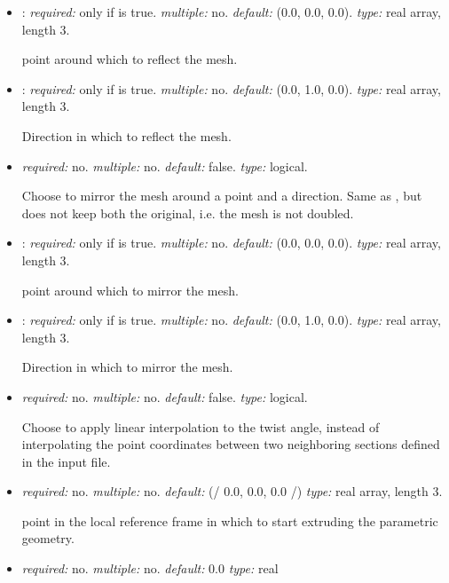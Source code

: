 \begin{itemize}
\item {}: \textit{required:} only if  is true. \textit{multiple:} no. 
\textit{default:} (0.0, 0.0, 0.0). \textit{type:} real array, length 3.

point around which to reflect the mesh.

\item {}: \textit{required:} only if  is true. \textit{multiple:} no. 
\textit{default:} (0.0, 1.0, 0.0). \textit{type:} real array, length 3.

Direction in which to reflect the mesh.

\item {} \textit{required:} no. \textit{multiple:} no. \textit{default:} false. \textit{type:} logical.

Choose to mirror the mesh around a point and a direction. Same as ,
but does not keep both the original, i.e. the mesh is not doubled.

\item {}:  \textit{required:} only if  is true. \textit{multiple:} no. 
\textit{default:} (0.0, 0.0, 0.0). \textit{type:} real array, length 3.

point around which to mirror the mesh.

\item {}: \textit{required:} only if  is true. \textit{multiple:} no. 
\textit{default:} (0.0, 1.0, 0.0). \textit{type:} real array, length 3.

Direction in which to mirror the mesh.

\item {} \textit{required:} no. 
\textit{multiple:} no. \textit{default:} false. \textit{type:} logical.

Choose to apply linear interpolation to the twist angle, instead of interpolating the point coordinates between two neighboring sections defined in the input file.

\item {} \textit{required:} no. \textit{multiple:} no. 
\textit{default:} (/ 0.0, 0.0, 0.0 /) \textit{type:} real array, length 3.

point in the local reference frame in which to start extruding the parametric geometry.

\item {} \textit{required:} no. 
\textit{multiple:} no. \textit{default:} 0.0 \textit{type:} real


\end{itemize}
